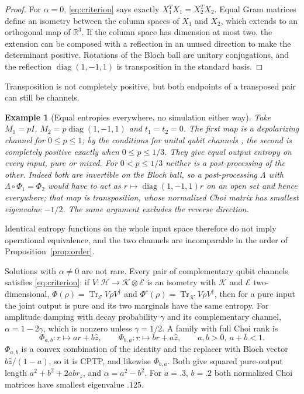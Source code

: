 \documentclass[12pt,a4paper]{article}
\newtheorem{example}[theorem]{Example}
\begin{document}
\begin{proof}
For $\alpha=0$, \eqref{eq:criterion} says exactly $X_1^TX_1=X_2^TX_2$. Equal Gram matrices define an isometry between the column spaces of $X_1$ and $X_2$, which extends to an orthogonal map of $\mathbb R^3$. If the column space has dimension at most two, the extension can be composed with a reflection in an unused direction to make the determinant positive. Rotations of the Bloch ball are unitary conjugations, and the reflection $\operatorname{diag}(1,-1,1)$ is transposition in the standard basis.
\end{proof}

Transposition is not completely positive, but both endpoints of a transposed pair can still be channels.

\begin{example}[Equal entropies everywhere, no simulation either way]
\label{ex:reflection}
Take $M_1=pI$, $M_2=p\operatorname{diag}(1,-1,1)$ and $t_1=t_2=0$. The first map is a depolarizing channel for $0\le p\le1$; by the conditions for unital qubit channels \cite{FujiwaraAlgoet1999}, the second is completely positive exactly when $0\le p\le1/3$. They give equal output entropy on every input, pure or mixed. For $0<p\le1/3$ neither is a post-processing of the other. Indeed both are invertible on the Bloch ball, so a post-processing $\Lambda$ with $\Lambda\circ\Phi_1=\Phi_2$ would have to act as $r\mapsto\operatorname{diag}(1,-1,1)r$ on an open set and hence everywhere; that map is transposition, whose normalized Choi matrix has smallest eigenvalue $-1/2$. The same argument excludes the reverse direction.
\end{example}

Identical entropy functions on the whole input space therefore do not imply operational equivalence, and the two channels are incomparable in the order of Proposition~\ref{prop:order}.

Solutions with $\alpha\ne0$ are not rare. Every pair of complementary qubit channels satisfies \eqref{eq:criterion}: if $V:\mathcal H\to\mathcal K\otimes\mathcal E$ is an isometry with $\mathcal K$ and $\mathcal E$ two-dimensional, $\Phi(\rho)=\operatorname{Tr}_{\mathcal E}V\rho V^\dagger$ and $\Phi^c(\rho)=\operatorname{Tr}_{\mathcal K}V\rho V^\dagger$, then for a pure input the joint output is pure and its two marginals have the same entropy. For amplitude damping with decay probability $\gamma$ and its complementary channel, $\alpha=1-2\gamma$, which is nonzero unless $\gamma=1/2$. A family with full Choi rank is
\[
\Phi_{a,b}:r\mapsto ar+b\hat z,\qquad \Phi_{b,a}:r\mapsto br+a\hat z,\qquad a,b>0,\ a+b<1 .
\]
$\Phi_{a,b}$ is a convex combination of the identity and the replacer with Bloch vector $b\hat z/(1-a)$, so it is CPTP, and likewise $\Phi_{b,a}$. Both give squared pure-output length $a^2+b^2+2abr_z$, and $\alpha=a^2-b^2$. For $a=.3$, $b=.2$ both normalized Choi matrices have smallest eigenvalue $.125$.
\end{document}
